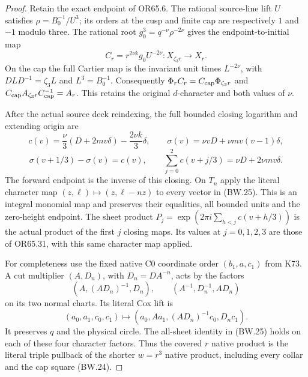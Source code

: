 \begin{proof}
\par\nobreak

Retain the exact endpoint of OR65.6. The rational source-line
lift \(U\) satisfies \(\rho=B_0^{-1}/U^3\); its orders at the
cusp and finite cap are respectively \(1\) and \(-1\) modulo
three. The rational root \(g_0^3=q^{-\nu}\rho^{-2\nu}\) gives
the endpoint-to-initial map
\[
 C_r=r^{2\nu k}g_0U^{-2\nu}:X_{\zeta_3r}\longrightarrow X_r.
                                                        \tag{BW.24}
\]
On the cap the full Cartier map is the invariant unit times
\(L^{-2\nu}\), with \(DLD^{-1}=\zeta_3L\) and \(L^3=B_0^{-1}\).
Consequently \(\Phi_rC_r=C_{\rm cap}\Phi_{\zeta_3r}\) and
\(C_{\rm cap}A_{\zeta_3r}C_{\rm cap}^{-1}=A_r\). This retains
the original \(d\)-character and both values of \(\nu\).

After the actual source deck reindexing, the full bounded
closing logarithm and extending origin are
\[
 c(v)=\frac{\nu}{3}(D+2mv\delta)-\frac{2\nu k}{3}\delta,
 \qquad \sigma(v)=\nu vD+\nu m v(v-1)\delta,
\]
\[
 \sigma(v+1/3)-\sigma(v)=c(v),\qquad
 \sum_{j=0}^2c(v+j/3)=\nu D+2\nu mv\delta.           \tag{BW.25}
\]
The forward endpoint is the inverse of this closing. On
\(T_n\) apply the literal character map \((z,\ell)\mapsto
(z,\ell-nz)\) to every vector in (BW.25). This is an
integral monomial map and preserves their equalities, all
bounded units and the zero-height endpoint. The sheet product
\(P_j=\exp(2\pi i\sum_{h<j}c(v+h/3))\) is the actual product
of the first \(j\) closing maps. Its values at \(j=0,1,2,3\) are
those of OR65.31, with this same character map applied.

For completeness use the fixed native C0 coordinate order
\((b_1,a,c_1)\) from K73. A cut multiplier \((A,D_n)\), with
\(D_n=DA^{-n}\), acts by the factors
\[
 (A,(AD_n)^{-1},D_n),\qquad
 (A^{-1},D_n^{-1},AD_n)
                                                        \tag{BW.26}
\]
on its two normal charts. Its literal Cox lift is
\[
 (a_0,a_1,c_0,c_1)\longmapsto
 (a_0,Aa_1,(AD_n)^{-1}c_0,D_n c_1).                  \tag{BW.27}
\]
It preserves \(q\) and the physical circle. The all-sheet
identity in (BW.25) holds on each of these four character
factors. Thus the covered \(r\) native product is the literal
triple pullback of the shorter \(w=r^3\) native product,
including every collar and the cap square (BW.24).


\end{proof}
